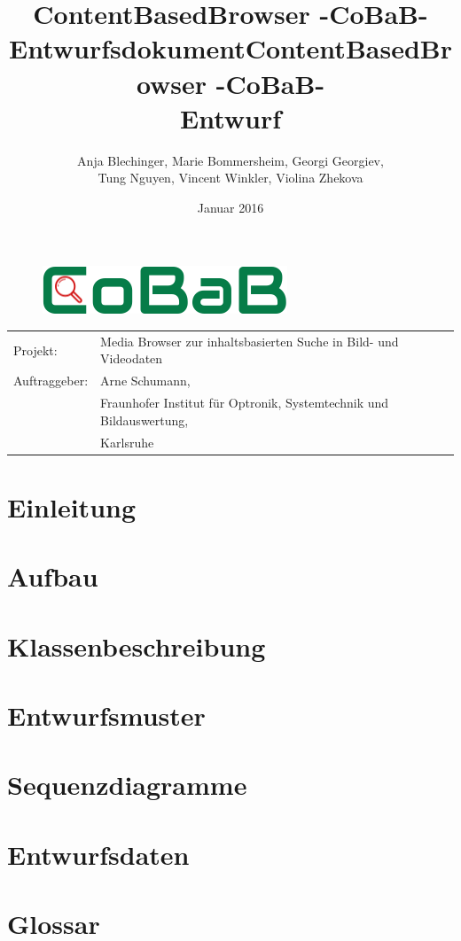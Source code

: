 \documentclass[parskip=full]{scrartcl}
\title{ContentBasedBrowser -CoBaB- \\ Entwurfsdokument}
\begin{document}
\begin{titlepage}
\title{ContentBasedBrowser -CoBaB- \\ Entwurf}
\author{Anja Blechinger, Marie Bommersheim, Georgi Georgiev,\\ Tung Nguyen, Vincent Winkler, Violina Zhekova}
\date{Januar 2016}
\maketitle
\vspace{50pt}

\begin{figure}[H]
\centering
\includegraphics{img/Logo}
\end{figure}

\vspace{200pt}
\begin{tabular}{l l}
Projekt: & Media Browser zur inhaltsbasierten Suche in Bild- und Videodaten\\
Auftraggeber: & Arne Schumann,\\
 & Fraunhofer Institut für Optronik, Systemtechnik und Bildauswertung,\\
 & Karlsruhe\\
\end{tabular}
\thispagestyle{empty}
\end{titlepage}
\setcounter{page}{1}

\tableofcontents
\pagebreak

\section{Einleitung}

\pagebreak

\section{Aufbau}

\pagebreak

\section{Klassenbeschreibung}

\pagebreak

\section{\gls{Entwurfsmuster}}

\pagebreak

\section{Sequenzdiagramme}

\pagebreak

\section{Entwurfsdaten}

\pagebreak


\section{Glossar}
\printglossaries
\end{document}
